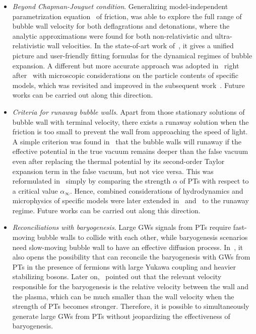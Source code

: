 \documentclass[a4paper,11pt]{article}
\begin{document}
\begin{itemize}
  \item \textit{Beyond Chapman-Jouguet condition}. Generalizing model-independent parametrization equation~\cite{KurkiSuonio:1995pp} of friction, \cite{Megevand:2009ut} was able to explore the full range of bubble wall velocity for both deflagrations and detonations, where the analytic approximations were found for both non-relativistic and ultra-relativistic wall velocities. In the state-of-art work of~\cite{Espinosa:2010hh}, it gives a unified picture and user-friendly fitting formulas for the dynamical regimes of bubble expansion. A different but more accurate approach was adopted in~\cite{Megevand:2009gh} right after~\cite{Megevand:2009ut} with microscopic considerations on the particle contents of specific models, which was revisited and improved in the subsequent work~\cite{Leitao:2012tx}. Future works can be carried out along this direction.
  \item \textit{Criteria for runaway bubble walls}. Apart from those stationary solutions of bubble wall with terminal velocity, there exists a runaway solution when the friction is too small to prevent the wall from approaching the speed of light. A simple criterion was found in~\cite{Bodeker:2009qy} that the bubble walls will runaway if the effective potential in the true vacuum remains deeper than the false vacuum even after replacing the thermal potential by its second-order Taylor expansion term in the false vacuum, but not vice versa. This was reformulated in~\cite{Espinosa:2010hh} simply by comparing the strength $\alpha$ of PTs with respect to a critical value $\alpha_\infty$. Hence, combined considerations of hydrodynamics and microphysics of specific models were later extended in~\cite{Leitao:2015ola} and~\cite{Huber:2015znp} to the runaway regime. Future works can be carried out along this direction.
  \item \textit{Reconciliations with baryogenesis}. Large GWs signals from PTs require fast-moving bubble walls to collide with each other, while baryogenesis scenarios need slow-moving bubble wall to have an effective diffusion process. In~\cite{Megevand:2009gh}, it also opens the possibility that can reconcile the baryogenesis with GWs from PTs in the presence of fermions with large Yukawa coupling and heavier stabilizing bosons. Later on,~\cite{No:2011fi} pointed out that the relevant velocity responsible for the baryogenesis is the relative velocity between the wall and the plasma, which can be much smaller than the wall velocity when the strength of PTs becomes stronger. Therefore, it is possible to simultaneously generate large GWs from PTs without jeopardizing the effectiveness of baryogenesis.
\end{itemize}
\end{document}
